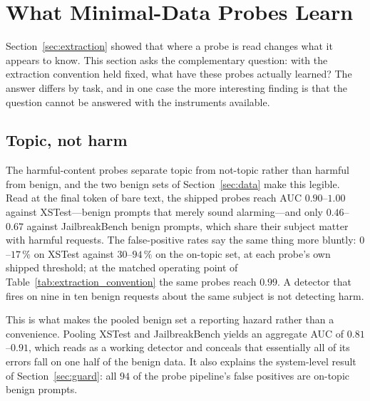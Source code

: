 \section{What Minimal-Data Probes Learn}
\label{sec:learn}

Section~\ref{sec:extraction} showed that where a probe is read changes what it appears to know. This section asks the
complementary question: with the extraction convention held fixed, what have these probes actually learned? The answer
differs by task, and in one case the more interesting finding is that the question cannot be answered with the
instruments available.

\subsection{Topic, not harm}
\label{sec:topicharm}

The harmful-content probes separate topic from not-topic rather than harmful from benign, and the two benign sets of
Section~\ref{sec:data} make this legible. Read at the final token of bare text, the shipped probes reach AUC
$0.90$--$1.00$ against XSTest---benign prompts that merely sound alarming---and only $0.46$--$0.67$ against
JailbreakBench benign prompts, which share their subject matter with harmful requests. The false-positive rates say
the same thing more bluntly: $0$--$17\,\%$ on XSTest against $30$--$94\,\%$ on the on-topic set, at each probe's own shipped threshold; at the
matched operating point of Table~\ref{tab:extraction_convention} the same probes reach $0.99$. A detector that fires
on nine in ten benign requests about the same subject is not detecting harm.

This is what makes the pooled benign set a reporting hazard rather than a convenience. Pooling XSTest and
JailbreakBench yields an aggregate AUC of $0.81$--$0.91$, which reads as a working detector and conceals that
essentially all of its errors fall on one half of the benign data. It also explains the system-level result of
Section~\ref{sec:guard}: all $94$ of the probe pipeline's false positives are on-topic benign prompts.

